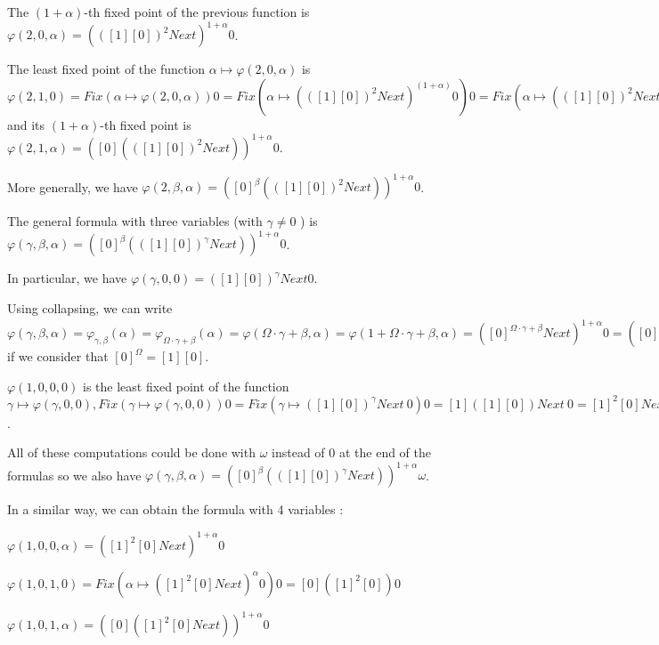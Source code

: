 \documentclass[10pt]{article}
\begin{document}
The \( (1+\alpha) \)-th fixed point of the previous function is \( \varphi(2,0,\alpha) = (([1] [0])^2 Next)^{1+\alpha} 0 \).

The least fixed point of the function \( \alpha \mapsto \varphi(2,0,\alpha) \) is \( \varphi(2,1,0) = Fix (\alpha \mapsto \varphi(2,0,\alpha)) 0 = Fix (\alpha \mapsto (([1] [0])^2 Next)^(1+\alpha) 0) 0 = Fix (\alpha \mapsto (([1] [0])^2 Next)^\alpha 0) = [0] (([1] [0])^2 Next) 0 \) and its \( (1+\alpha) \)-th fixed point is \( \varphi(2,1,\alpha) = ([0] (([1] [0])^2 Next))^{1+\alpha} 0 \).

More generally, we have \( \varphi(2,\beta,\alpha) = ([0]^\beta (([1] [0])^2 Next))^{1+\alpha} 0 \).

\bigskip

The general formula with three variables (with \( \gamma \neq 0 \) ) is \( \varphi(\gamma,\beta,\alpha) = ([0]^\beta (([1] [0])^\gamma Next))^{1+\alpha} 0 \).

In particular, we have \( \varphi(\gamma,0,0) = ([1] [0])^\gamma Next 0 \).

\bigskip

Using collapsing, we can write \( \varphi(\gamma,\beta,\alpha) = \varphi_{\gamma,\beta}(\alpha) = \varphi_{\Omega \cdot \gamma + \beta}(\alpha) = \varphi(\Omega \cdot \gamma + \beta, \alpha) = \varphi(1 + \Omega \cdot \gamma + \beta, \alpha) = ([0]^{\Omega \cdot \gamma + \beta} Next)^{1+\alpha} 0 = ([0]^\beta (([0]^\Omega)^\gamma Next))^{1+\alpha} 0 = ([0]^\beta (([1] [0])^\gamma Next))^{1+\alpha} 0 \) if we consider that \( [0]^\Omega = [1] [0] \).

\bigskip

\( \varphi(1,0,0,0) \) is the least fixed point of the function \( \gamma \mapsto \varphi(\gamma,0,0), Fix (\gamma \mapsto \varphi(\gamma,0,0)) 0 = Fix (\gamma \mapsto ([1] [0])^\gamma Next\ 0) 0 = [1] ([1] [0]) Next\ 0 = [1]^2 [0] Next\ 0 \).

All of these computations could be done with \( \omega \) instead of 0 at the end of the formulas so we also have \( \varphi(\gamma,\beta,\alpha) = ([0]^\beta (([1] [0])^\gamma Next))^{1+\alpha} \omega \).

In a similar way, we can obtain the formula with 4 variables :

\( \varphi(1,0,0,\alpha) = ([1]^2 [0] Next)^{1+\alpha} 0 \)

\( \varphi(1,0,1,0) = Fix (\alpha \mapsto ([1]^2 [0] Next)^\alpha 0) 0 = [0] ([1]^2 [0]) 0 \)

\( \varphi (1,0,1,\alpha) = ([0] ([1]^2 [0] Next))^{1+\alpha} 0 \)
\end{document}
